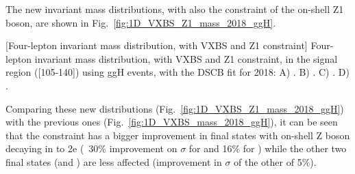 The new invariant mass distributions, with also the constraint of the on-shell Z1 boson, are shown in 
Fig.~\ref{fig:1D_VXBS_Z1_mass_2018_ggH}.
\begin{multiFigure}
    \centering
        [Four-lepton invariant mass distribution, with VXBS and Z1 constraint]
        {Four-lepton invariant mass distribution, with VXBS and Z1 constraint, in the signal region ([105-140]\GeV) using ggH events, with the DSCB fit for 2018: %
        \;A) \fourmu.
        \;B) \foure.
        \;C) \twoetwomu.
        \;D) \twomutwoe.} 
    \label{fig:1D_VXBS_Z1_mass_2018_ggH}
\end{multiFigure}
Comparing these new distributions (Fig.~\ref{fig:1D_VXBS_Z1_mass_2018_ggH}) with the previous ones (Fig.~\ref{fig:1D_VXBS_mass_2018_ggH}), it can be seen that the \Zone constraint has a bigger improvement in final states with on-shell Z boson decaying in to 2e (~30$\%$ improvement on $\sigma$ for \twoetwomu and 16$\%$ for \foure) while the other two final states (\fourmu and \twomutwoe) are less affected (improvement in $\sigma$ of the other of 5$\%$).

